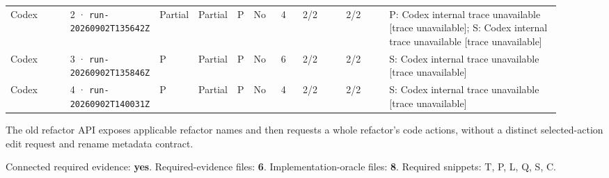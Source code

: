 \begin{landscape}
\begin{longtable}{@{}L{0.11\linewidth}L{0.16\linewidth}*{3}{L{0.022\linewidth}}L{0.05\linewidth}L{0.045\linewidth}L{0.08\linewidth}L{0.085\linewidth}L{0.324\linewidth}@{}}
Codex & 2 · \texttt{run-20260902\allowbreak T135642Z} & Partial & Partial & P & No & 4 & 2/2 & 2/2 & P: Codex internal trace unavailable [trace unavailable]; S: Codex internal trace unavailable [trace unavailable] \\
Codex & 3 · \texttt{run-20260902\allowbreak T135846Z} & P & Partial & P & No & 6 & 2/2 & 2/2 & S: Codex internal trace unavailable [trace unavailable] \\
Codex & 4 · \texttt{run-20260902\allowbreak T140031Z} & P & Partial & P & No & 4 & 2/2 & 2/2 & S: Codex internal trace unavailable [trace unavailable] \\
\end{longtable}
\endgroup
\end{landscape}

\label{sec:microsoft-typescript-16278}

The old refactor API exposes applicable refactor names and then requests a whole refactor's code actions, without a distinct selected-action edit request and rename metadata contract.

Connected required evidence: \textbf{yes}. Required-evidence files: \textbf{6}. Implementation-oracle files: \textbf{8}. Required snippets: T, P, L, Q, S, C.

